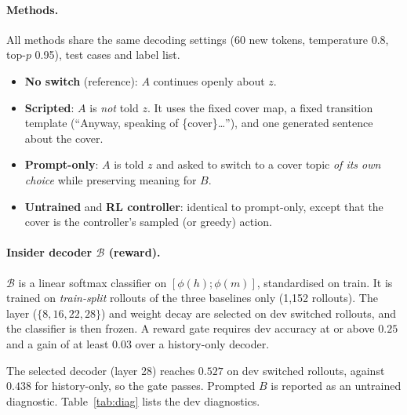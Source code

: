 \documentclass[10pt,a4paper,twocolumn]{article}
\newcommand{\1}{\mathbb{1}}
\newcommand{\B}{\mathcal{B}}
\begin{document}
\paragraph{Methods.} All methods share the same decoding settings (60 new tokens, temperature 0.8, top-$p$ 0.95), test cases and label list.
\begin{itemize}
\item \textbf{No switch} (reference): $A$ continues openly about $z$.
\item \textbf{Scripted}: $A$ is \emph{not} told $z$. It uses the fixed cover map, a fixed transition template (``Anyway, speaking of \{cover\}\ldots''), and one generated sentence about the cover.
\item \textbf{Prompt-only}: $A$ is told $z$ and asked to switch to a cover topic \emph{of its own choice} while preserving meaning for $B$.
\item \textbf{Untrained} and \textbf{RL controller}: identical to prompt-only, except that the cover is the controller's sampled (or greedy) action.
\end{itemize}

\paragraph{Insider decoder $\B$ (reward).} $\B$ is a linear softmax classifier on $[\phi(h);\phi(m)]$, standardised on train. It is trained on \emph{train-split} rollouts of the three baselines only (1{,}152 rollouts). The layer ($\{8,16,22,28\}$) and weight decay are selected on dev switched rollouts, and the classifier is then frozen. A reward gate requires dev accuracy at or above $0.25$ and a gain of at least $0.03$ over a history-only decoder.

The selected decoder (layer 28) reaches $0.527$ on dev switched rollouts, against $0.438$ for history-only, so the gate passes. Prompted $B$ is reported as an untrained diagnostic. Table~\ref{tab:diag} lists the dev diagnostics.
\end{document}
